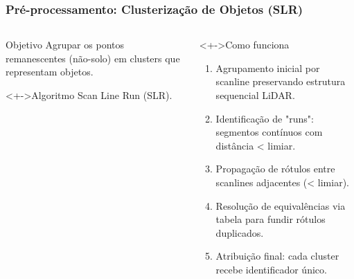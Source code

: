 \documentclass[aspectratio=169,t,xcolor=table]{beamer}
\begin{document}
\begin{frame}
    \frametitle{Pré-processamento: Clusterização de Objetos (SLR)}
    \begin{columns}[T]
        \begin{column}{.4\textwidth}
            \begin{block}{Objetivo}
                \vspace{0.5em}
                Agrupar os pontos remanescentes (não-solo) em clusters que representam objetos.
                \vspace{0.5em}
            \end{block}
            \begin{block}<+->{Algoritmo}
                \vspace{0.5em}
                Scan Line Run (SLR).
                \vspace{0.5em}
            \end{block}
        \end{column}
        \begin{column}{.6\textwidth}
            \begin{block}<+->{Como funciona}
                \begin{enumerate}[<+->]
                    \item Agrupamento inicial por scanline preservando estrutura sequencial LiDAR.
                    \item Identificação de "runs": segmentos contínuos com distância < limiar.
                    \item Propagação de rótulos entre scanlines adjacentes (< limiar).
                    \item Resolução de equivalências via tabela para fundir rótulos duplicados.
                    \item Atribuição final: cada cluster recebe identificador único.
                \end{enumerate}
            \end{block}
        \end{column}
    \end{columns}
\end{frame}
\end{document}
